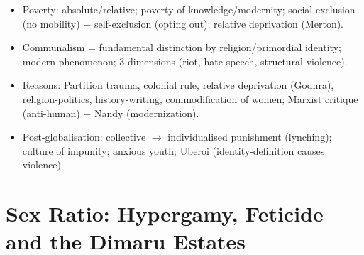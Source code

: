 \begin{QuickRevision}
\begin{itemize}
\item Poverty: absolute/relative; poverty of knowledge/modernity; social exclusion (no mobility) + self-exclusion (opting out); relative deprivation (Merton).
\item Communalism = fundamental distinction by religion/primordial identity; modern phenomenon; 3 dimensions (riot, hate speech, structural violence).
\item Reasons: Partition trauma, colonial rule, relative deprivation (Godhra), religion-politics, history-writing, commodification of women; Marxist critique (anti-human) + Nandy (modernization).
\item Post-globalisation: collective $\rightarrow$ individualised punishment (lynching); culture of impunity; anxious youth; Uberoi (identity-definition causes violence).
\end{itemize}
\end{QuickRevision}

\section{Sex Ratio: Hypergamy, Feticide and the Dimaru Estates}

